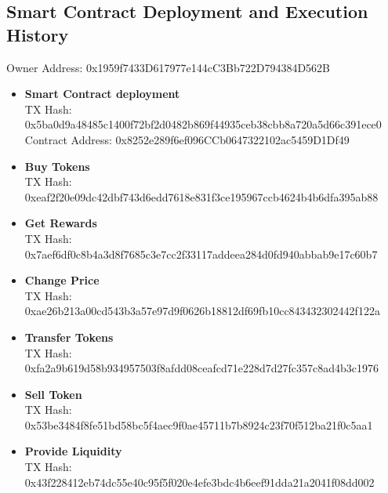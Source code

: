 \documentclass[12pt,a4paper]{article}
\begin{document}
\subsection*{Smart Contract Deployment and Execution History}

Owner Address: 0x1959f7433D617977e144cC3Bb722D794384D562B

\begin{itemize}
    \item \textbf{Smart Contract deployment}\\
    TX Hash: 0x5ba0d9a48485c1400f72bf2d0482b869f44935ceb38cbb8a720a5d66c391ece0 \\
    Contract Address: 0x8252e289f6ef096CCb0647322102ac5459D1Df49
    \item \textbf{Buy Tokens}\\
    TX Hash: 0xeaf2f20e09dc42dbf743d6edd7618e831f3ce195967ccb4624b4b6dfa395ab88
    \item \textbf{Get Rewards}\\
    TX Hash: 0x7aef6df0c8b4a3d8f7685c3e7cc2f33117addeea284d0fd940abbab9e17c60b7
    \item \textbf{Change Price}\\
    TX Hash: 0xae26b213a00cd543b3a57e97d9f0626b18812df69fb10cc843432302442f122a
    \item \textbf{Transfer Tokens}\\
    TX Hash: 0xfa2a9b619d58b934957503f8afdd08ceafcd71e228d7d27fc357c8ad4b3c1976
    \item \textbf{Sell Token}\\
    TX Hash: 0x53be3484f8fe51bd58bc5f4aec9f0ae45711b7b8924c23f70f512ba21f0c5aa1
    \item \textbf{Provide Liquidity}\\
    TX Hash: 0x43f228412eb74dc55e40c95f5f020e4efe3bdc4b6eef91dda21a2041f08dd002\\
\end{itemize}
\end{document}
